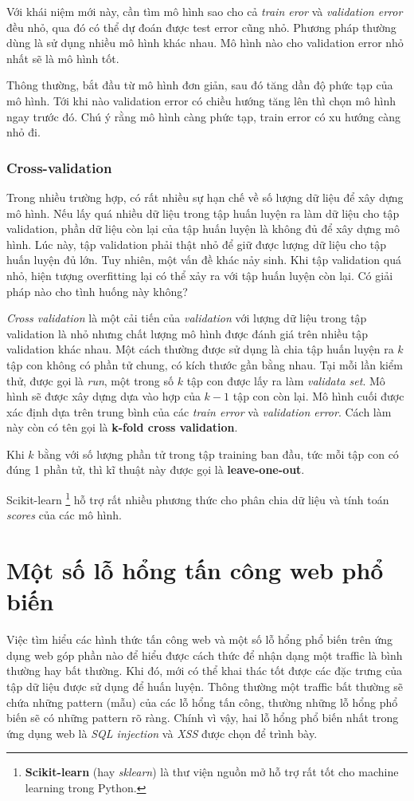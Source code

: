\documentclass[../main-report.tex]{subfiles}
\begin{document}
Với khái niệm mới này, cần tìm mô hình sao cho cả \emph{train eror} và \emph{validation error} đều nhỏ, qua đó có thể dự đoán được test error cũng nhỏ. Phương pháp thường dùng là sử dụng nhiều mô hình khác nhau. Mô hình nào cho validation error nhỏ nhất sẽ là mô hình tốt.

Thông thường, bắt đầu từ mô hình đơn giản, sau đó tăng dần độ phức tạp của mô hình. Tới khi nào validation error có chiều hướng tăng lên thì chọn mô hình ngay trước đó. Chú ý rằng mô hình càng phức tạp, train error có xu hướng càng nhỏ đi.

\subsubsection*{Cross-validation}
Trong nhiều trường hợp, có rất nhiều sự hạn chế về số lượng dữ liệu để xây dựng mô hình. Nếu lấy quá nhiều dữ liệu trong tập huấn luyện ra làm dữ liệu cho tập validation, phần dữ liệu còn lại của tập huấn luyện là không đủ để xây dựng mô hình. Lúc này, tập validation phải thật nhỏ để giữ được lượng dữ liệu cho tập huấn luyện đủ lớn. Tuy nhiên, một vấn đề khác nảy sinh. Khi tập validation quá nhỏ, hiện tượng overfitting lại có thể xảy ra với tập huấn luyện còn lại. Có giải pháp nào cho tình huống này không?

\emph{Cross validation} là một cải tiến của \emph{validation} với lượng dữ liệu trong tập validation là nhỏ nhưng chất lượng mô hình được đánh giá trên nhiều tập validation khác nhau. Một cách thường được sử dụng là chia tập huấn luyện ra \(k\) tập con không có phần tử chung, có kích thước gần bằng nhau. Tại mỗi lần kiểm thử, được gọi là \emph{run}, một trong số \(k\) tập con được lấy ra làm \emph{validata set}. Mô hình sẽ được xây dựng dựa vào hợp của \(k-1\) tập con còn lại. Mô hình cuối được xác định dựa trên trung bình của các \emph{train error} và \emph{validation error}. Cách làm này còn có tên gọi là \textbf{k-fold cross validation}.

Khi \(k\) bằng với số lượng phần tử trong tập training ban đầu, tức mỗi tập con có đúng 1 phần tử, thì kĩ thuật này được gọi là \textbf{leave-one-out}.

Scikit-learn \footnote{\textbf{Scikit-learn} (hay \emph{sklearn}) là thư viện nguồn mở hỗ trợ rất tốt cho machine learning trong Python.} hỗ trợ rất nhiều phương thức cho phân chia dữ liệu và tính toán \emph{scores} của các mô hình.
\section{Một số lỗ hổng tấn công web phổ biến}
Việc tìm hiểu các hình thức tấn công web và một số lỗ hổng phổ biến trên ứng dụng web góp phần nào để hiểu được cách thức để nhận dạng một traffic là bình thường hay bất thường. Khi đó, mới có thể khai thác tốt được các đặc trưng của tập dữ liệu được sử dụng để huấn luyện. Thông thường một traffic bất thường sẽ chứa những pattern (mẫu) của các lỗ hổng tấn công, thường những lỗ hổng phổ biến sẽ có những pattern rõ ràng. Chính vì vậy, hai lỗ hổng phổ biến nhất trong ứng dụng web là \emph{SQL injection} và \emph{XSS} được chọn để trình bày.
\end{document}
